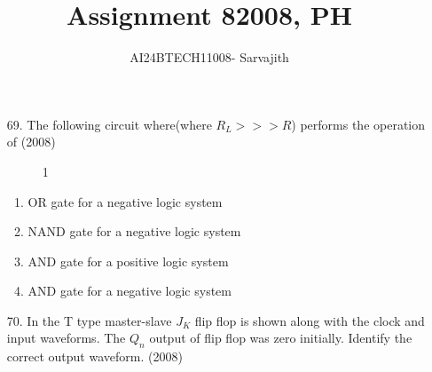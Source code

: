\documentclass[journal]{IEEEtran}
\begin{document}

\vspace{3cm}


\author{AI24BTECH11008- Sarvajith
}
\title{Assignment 8}
 \maketitle
{\let\newpage\relax\maketitle}
\title{2008, PH}
\renewcommand{\thefigure}{\theenumi}
\renewcommand{\thetable}{\theenumi}
\setlength{\intextsep}{10pt} %
\renewcommand{\thetable}{\theenumi}
\begin{enumerate}
    \item[69.] The following circuit where(where $R_L>>>R$) performs the operation of \hfill (2008)
    \begin{figure}[!ht]
    \centering
    \caption{1}
    \label{fig1}
     \end{figure}
    \begin{enumerate} [label=(\Alph*)]
        \item OR gate for a negative logic system
        \item NAND gate for a negative logic system 
        \item AND gate for a positive logic system
        \item AND gate for a negative logic system
    \end{enumerate}
    \item[70.]  In the T type master-slave $J_K$ flip flop is shown along with the clock and input waveforms. The $Q_n$ output of flip flop was zero initially. Identify the correct output waveform. \hfill (2008)
     

\end{enumerate}
\end{document}
